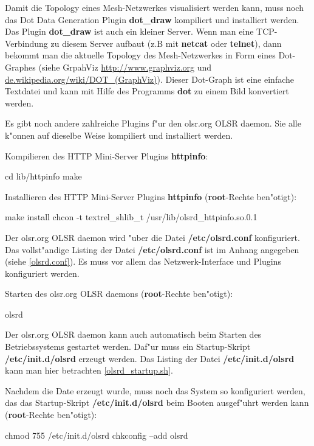 Damit die Topology eines Mesh-Netzwerkes visualisiert werden kann,
muss noch das Dot Data Generation Plugin \textbf{dot\_draw}
kompiliert und installiert werden. Das Plugin \textbf{dot\_draw}
ist auch ein kleiner Server. Wenn man eine TCP-Verbindung zu diesem Server
aufbaut (z.B mit \textbf{netcat} oder \textbf{telnet}),
dann bekommt man die aktuelle Topology des Mesh-Netzwerkes in
Form eines Dot-Graphes
(siehe GrpahViz \url{http://www.graphviz.org} und
 \url{de.wikipedia.org/wiki/DOT\_(GraphViz)}).
Dieser Dot-Graph ist eine einfache Textdatei und kann mit Hilfe des
Programms \textbf{dot} zu einem Bild konvertiert werden.

Es gibt noch andere zahlreiche Plugins f"ur
den olsr.org OLSR daemon. Sie alle k"onnen auf dieselbe Weise kompiliert
und installiert werden.

Kompilieren des HTTP Mini-Server Plugins \textbf{httpinfo}:
\begin{shelllst}
cd lib/httpinfo
make
\end{shelllst}

Installieren des HTTP Mini-Server Plugins \textbf{httpinfo}
(\textbf{root}-Rechte ben"otigt):
\begin{shelllst}
make install 
chcon -t textrel_shlib_t /usr/lib/olsrd_httpinfo.so.0.1
\end{shelllst}

Der olsr.org OLSR daemon wird "uber die Datei \textbf{/etc/olsrd.conf}
konfiguriert.  Das vollst"andige Listing der Datei \textbf{/etc/olsrd.conf} ist
im Anhang angegeben (siehe \ref{olsrd.conf}).
Es muss vor allem das Netzwerk-Interface und Plugins konfiguriert werden.

Starten des olsr.org OLSR daemons
(\textbf{root}-Rechte ben"otigt):
\begin{shelllst}
olsrd
\end{shelllst}

Der olsr.org OLSR daemon kann auch automatisch beim Starten
des Betriebssystems gestartet werden. Daf"ur muss ein Startup-Skript
\textbf{/etc/init.d/olsrd} erzeugt werden. Das Listing der Datei
\textbf{/etc/init.d/olsrd} kann man hier betrachten \ref{olsrd_startup.sh}.

Nachdem die Date erzeugt wurde, muss noch das System so konfiguriert
werden, das das Startup-Skript \textbf{/etc/init.d/olsrd} beim Booten
ausgef"uhrt werden kann (\textbf{root}-Rechte ben"otigt):
\begin{shelllst}
chmod 755 /etc/init.d/olsrd
chkconfig --add olsrd
\end{shelllst}

